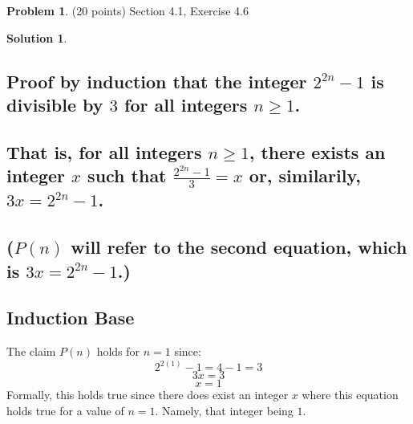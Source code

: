 \documentclass{article}
\theoremstyle{definition}
\newtheorem{problem}{Problem}
\newtheorem*{solution}{Solution}
\begin{document}
\newpage
\begin{problem} (20 points) Section 4.1, Exercise 4.6 
\end{problem}
\begin{solution}
\hspace{1cm}
\subsection*{Proof by induction that the integer $2^{2n} - 1$ is divisible by $3$ for all integers $n \geqslant 1$.\\\\
That is, for all integers $n \geqslant 1$, there exists an integer $x$ such that $\frac{2^{2n} - 1}{3} = x$ or, similarily, $3x = 2^{2n} - 1$.\\\\
($P(n)$ will refer to the second equation, which is $3x = 2^{2n} - 1$.)}
\subsection*{Induction Base}
The claim $P(n)$ holds for $n = 1$ since:\\
$$2^{2(1)} - 1 = 4 - 1 = 3 $$
$$3x = 3 $$
$$x = 1$$
Formally, this holds true since there does exist an integer $x$ where this equation holds true for a value of $n = 1$. Namely, that integer being $1$.

\end{solution}
\end{document}
